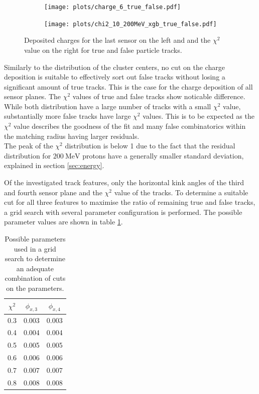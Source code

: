 \begin{figure}
  \hspace{-2.5cm}
  \begin{subfigure}{0.62\textwidth}
      \centering
      \texttt{[image: plots/charge\_6\_true\_false.pdf]}
  \end{subfigure}
  \begin{subfigure}{0.62\textwidth}
      \hspace{0.95cm}
      \texttt{[image: plots/chi2\_10\_200MeV\_xgb\_true\_false.pdf]}
  \end{subfigure}
  \caption{Deposited charges for the last sensor on the left and and the $\chi^2$ value on the right for true and false particle tracks.}
  \label{fig:charge_chi}
\end{figure}

Similarly to the distribution of the cluster centers, no cut on the charge deposition is suitable to effectively sort out false tracks without losing a significant
amount of true tracks. This is the case for the charge deposition of all sensor planes.
The $\chi^2$ values of true and false tracks show noticable difference. While both distribution have a large number of tracks
with a small $\chi^2$ value, substantially more false tracks have large $\chi^2$ values. This is to be expected as the $\chi^2$ value describes the goodness of the fit and
many false combinatorics within the matching radius having larger residuals. \\
The peak of the $\chi^2$ distribution is below 1 due to the fact that the residual distribution
for $\SI{200}{\mega\eV}$ protons have a generally smaller standard deviation, explained in section \ref{sec:energy}.

Of the investigated track features, only the horizontal kink angles of the third and fourth sensor plane and the $\chi^2$ value of the tracks. To determine a suitable
cut for all three features to maximise the ratio of remaining true and false tracks, a grid search with several parameter configuration is performed. The
possible parameter values are shown in table \ref{tab:params}.

\begin{table}
  \centering
  \begin{tabular}{c c c}
    \toprule
    $\chi^2$ & $\phi_{x,3}$ & $\phi_{x,4}$\\
    \midrule
    0.3 & 0.003 & 0.003 \\
    0.4 & 0.004 & 0.004 \\
    0.5 & 0.005 & 0.005 \\
    0.6 & 0.006 & 0.006 \\
    0.7 & 0.007 & 0.007 \\
    0.8 & 0.008 & 0.008
  \end{tabular}
  \caption{Possible parameters used in a grid search to determine an adequate combination of cuts on the parameters.}
  \label{tab:params}
\end{table}

